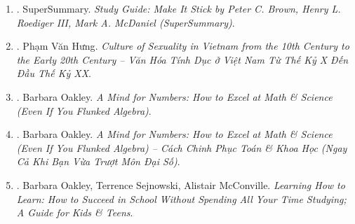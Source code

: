 \documentclass{article}
\begin{document}
\begin{enumerate}
\begin{itemize}
		\item ``Learning is essential \& life-long. Yet as these authors argue convincingly, people often use exactly the wrong strategies \& don't appreciate the ones that work. We've learned a lot in the last decade about applying cognitive science to real-world learning, \& this book combines everyday examples with clear explanations of the research. It's easy to read -- \& should be easy to learn from, too!'' -- {\sc Daniel L. Schacter}, author of {\it The 7 Sins of Memory}
		\item ``Anyone who teaches anything would benefit from reading this book: coaches, tutors, classroom teachers, parents, even corporate trainers. Instead of dong what we've always done \& wondering why some learners just don't get it, we can take a different approach that's based on research, even if it seems counterintuitive.'' -- {\sc Jennifer Gonzales}, {\it Cult of Pedagogy}		
	\end{itemize}
	{\sf About the Author.} {\sc Peter C. Brown} is a writer \& former management consultant. {\sc Henry L. Roediger III} is James S. McDonnell Distinguished University Professor of Psychology at Washington University in St. Louis. {\sc Mark A. McDaniel} is Professor of Psychology \& Director of the Center for Integrative Research on Cognition, Learning, \& Education (CIRCLE) at Washington University in St. Louis.
	
	\item \cite{SuperSummary_Brown_Roediger_McDaniel_stick}. {\sc SuperSummary}. {\it Study Guide: Make It Stick by Peter C. Brown, Henry L. Roediger III, Mark A. McDaniel (SuperSummary)}.
	
	\item \cite{Hung_sex_culture}. {\sc Phạm Văn Hưng}. {\it Culture of Sexuality in Vietnam from the 10th Century to the Early 20th Century -- Văn Hóa Tính Dục ở Việt Nam Từ Thế Kỷ X Đến Đầu Thế Kỷ XX}.\hfill{\sf[done]}
	
	\item \cite{Oakley_mind_number}. Barbara Oakley. {\it A Mind for Numbers: How to Excel at Math \& Science (Even If You Flunked Algebra)}.\hfill{\sf[reading]}
	
	\item \cite{Oakley_mind_number}. Barbara Oakley. {\it A Mind for Numbers: How to Excel at Math \& Science (Even If You Flunked Algebra) -- Cách Chinh Phục Toán \& Khoa Học (Ngay Cả Khi Bạn Vừa Trượt Môn Đại Số)}.\hfill{\sf[done]}
	
	\item \cite{Oakley_Sejnowski_McConville_learn_how_learn}. Barbara Oakley, Terrence Sejnowski, Alistair McConville. {\it Learning How to Learn: How to Succeed in School Without Spending All Your Time Studying; A Guide for Kids \& Teens}.\hfill{\sf[reading]}
	

\end{enumerate}
\end{document}
